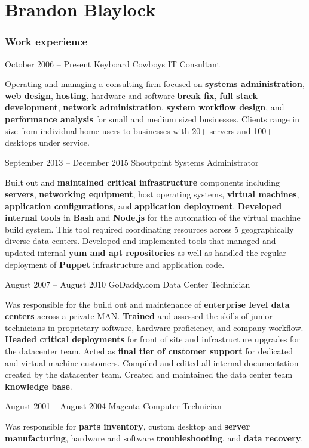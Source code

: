 \documentclass{tccv}
\begin{document}
\part{Brandon Blaylock}

\section{Work experience}

\begin{eventlist}

\item{October 2006 -- Present}
     {Keyboard Cowboys}
     {IT Consultant}

Operating and managing a consulting firm focused on \textbf{systems
administration}, \textbf{web design}, \textbf{hosting}, hardware
and software \textbf{break fix}, \textbf{full stack development},
\textbf{network administration}, \textbf{system workflow design},
and \textbf{performance analysis} for small and medium
sized businesses. Clients range in size from individual home
users to businesses with 20+ servers and 100+ desktops under
service.

\item{September 2013 -- December 2015}
     {Shoutpoint}
     {Systems Administrator}

Built out and \textbf{maintained critical infrastructure} components
including \textbf{servers}, \textbf{networking equipment}, host operating
systems, \textbf{virtual machines}, \textbf{application configurations},
and \textbf{application deployment}. \textbf{Developed internal tools}
in \textbf{Bash} and \textbf{Node.js} for the automation of the virtual
machine build system. This tool required coordinating resources
across 5 geographically diverse data centers. Developed and
implemented tools that managed and updated internal \textbf{yum and
apt repositories} as well as handled the regular deployment of
\textbf{Puppet} infrastructure and application code.

\item{August 2007 -- August 2010}
     {GoDaddy.com}
     {Data Center Technician}

Was responsible for the build out and maintenance of \textbf{enterprise
level data centers} across a private MAN. \textbf{Trained} and assessed
the skills of junior technicians in proprietary software, hardware
proficiency, and company workflow. \textbf{Headed critical deployments}
for front of site and infrastructure upgrades for the datacenter team.
Acted as \textbf{final tier of customer support} for dedicated and
virtual machine customers. Compiled and edited all internal documentation
created by the datacenter team. Created and maintained the data center
team \textbf{knowledge base}.

\item{August 2001 -- August 2004}
     {Magenta Computer}
     {Technician}

Was responsible for \textbf{parts inventory}, custom desktop and
\textbf{server manufacturing}, hardware and software
\textbf{troubleshooting}, and \textbf{data recovery}.

\end{eventlist}
\end{document}
